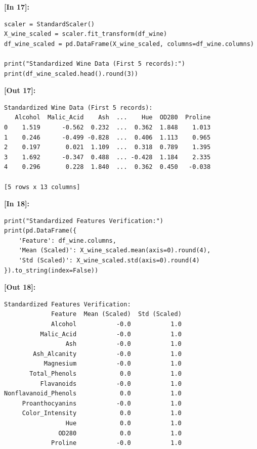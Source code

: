 \vspace{0.4em}
\noindent\textbf{\small [In 17]:}
\begin{lstlisting}[style=pycode]
scaler = StandardScaler()
X_wine_scaled = scaler.fit_transform(df_wine)
df_wine_scaled = pd.DataFrame(X_wine_scaled, columns=df_wine.columns)

print("Standardized Wine Data (First 5 records):")
print(df_wine_scaled.head().round(3))
\end{lstlisting}
\noindent\textbf{\small [Out 17]:}
\begin{lstlisting}[style=output]
Standardized Wine Data (First 5 records):
   Alcohol  Malic_Acid    Ash  ...    Hue  OD280  Proline
0    1.519      -0.562  0.232  ...  0.362  1.848    1.013
1    0.246      -0.499 -0.828  ...  0.406  1.113    0.965
2    0.197       0.021  1.109  ...  0.318  0.789    1.395
3    1.692      -0.347  0.488  ... -0.428  1.184    2.335
4    0.296       0.228  1.840  ...  0.362  0.450   -0.038

[5 rows x 13 columns]
\end{lstlisting}

\vspace{0.4em}
\noindent\textbf{\small [In 18]:}
\begin{lstlisting}[style=pycode]
print("Standardized Features Verification:")
print(pd.DataFrame({
    'Feature': df_wine.columns,
    'Mean (Scaled)': X_wine_scaled.mean(axis=0).round(4),
    'Std (Scaled)': X_wine_scaled.std(axis=0).round(4)
}).to_string(index=False))
\end{lstlisting}
\noindent\textbf{\small [Out 18]:}
\begin{lstlisting}[style=output]
Standardized Features Verification:
             Feature  Mean (Scaled)  Std (Scaled)
             Alcohol           -0.0           1.0
          Malic_Acid           -0.0           1.0
                 Ash           -0.0           1.0
        Ash_Alcanity           -0.0           1.0
           Magnesium           -0.0           1.0
       Total_Phenols            0.0           1.0
          Flavanoids           -0.0           1.0
Nonflavanoid_Phenols            0.0           1.0
     Proanthocyanins           -0.0           1.0
     Color_Intensity            0.0           1.0
                 Hue            0.0           1.0
               OD280            0.0           1.0
             Proline           -0.0           1.0
\end{lstlisting}

